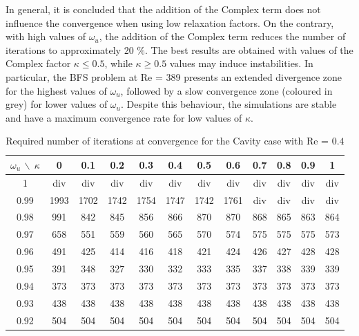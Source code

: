 \documentclass[final,3p,times,11pt,onecolumn]{myElsarticle}
\numberwithin{equation}{section}
\begin{document}
In general, it is concluded that the addition of the Complex term does not influence the convergence when using low relaxation factors. On the contrary, with high values of $\omega_u$, the addition of the Complex term reduces the number of iterations to approximately 20 $\%$. The best results are obtained with values of the Complex factor $\kappa \leq 0.5$, while $\kappa \geq 0.5$ values may induce instabilities. In particular, the BFS problem at Re = 389 presents an extended divergence zone for the highest values of $\omega_u$, followed by a slow convergence zone (coloured in grey) for lower values of $\omega_u$. Despite this behaviour, the simulations are stable and have a maximum convergence rate for low values of $\kappa$.
\begin{table}[b!!]
\centering
\begin{tabular}{c|ccccccccccc}
\hline 
$\omega_u\,\backslash\:\kappa$ & 0 & 0.1 & 0.2 & 0.3 & 0.4 & 0.5 & 0.6 & 0.7 & 0.8 & 0.9 & 1 \\ 
\hline 
1 & div & div & div & div & div & div & div & div & div & div & div \\ 
0.99 & 1993 & 1702 & 1742 & 1754 & 1747 & 1742 & 1761 & div & div & div & div \\ 
0.98 & 991 & 842  & 845 & 856 & 866 & 870 & 870 & 868 & 865 & 863 & 864 \\ 
0.97 & 658 & 551  & 559 & 560 & 565 & 570 & 574 & 575 & 575 & 575 & 573 \\ 
0.96 & 491 &425  & 414 & 416 & 418 & 421 & 424 & 426 & 427 & 428 & 428 \\ 
0.95 & 391 & 348 & 327 & 330 & 332 & 333 & 335 & 337 & 338 & 339 & 339 \\ 
0.94 & 373 & 373 & 373 & 373 & 373 & 373 & 373 & 373 & 373 & 373 & 373 \\ 
0.93 & 438 & 438 & 438 & 438 & 438 & 438 & 438 & 438 & 438 & 438 & 438 \\ 
0.92 & 504 & 504 & 504 & 504 & 504 & 504 & 504 & 504 & 504 & 504 & 504 \\ 
\hline 
\end{tabular} 
\caption{Required number of iterations at convergence for the Cavity case with Re = $0.4$}
\label{Table:Cavity_LowRe}
\end{table}
\end{document}
